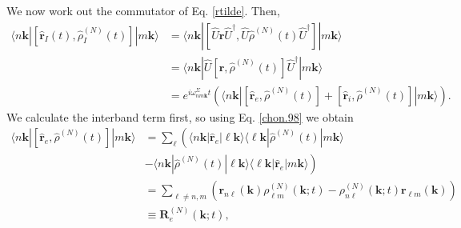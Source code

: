 We now work out the commutator of Eq. \eqref{rtilde}. Then,
\begin{align}\label{conmu1}
\langle n\mathbf{k}|
[\hat{\mathbf{r}}_{I}(t),\hat{\rho}^{(N)}_{I}(t)]
|m\mathbf{k}\rangle
&=
\langle n\mathbf{k}|
[\hat{U}\hat{\mathbf{r}}\hat{U}^\dagger,\hat{U}\hat{\rho}^{(N)}(t)\hat{U}^\dagger]
|m\mathbf{k}\rangle
\nonumber \\
&=
\langle n\mathbf{k}|
\hat{U}[\hat{\mathbf{r}},\hat{\rho}^{(N)}(t)]\hat{U}^\dagger
|m\mathbf{k}\rangle
\\
&=
e^{i\omega^\Sigma_{nm\mathbf{k}}t}
\left(
\langle n\mathbf{k}|
[\hat{\mathbf{r}}_e,\hat{\rho}^{(N)}(t)]
+
[\hat{\mathbf{r}}_i,\hat{\rho}^{(N)}(t)]
|m\mathbf{k}\rangle
\right)
\nonumber
.
\end{align}
We calculate the interband term first, so using Eq. \eqref{chon.98} we obtain
\begin{align}\label{conmu2}
\langle n\mathbf{k}|
[\hat{\mathbf{r}}_e,\hat{\rho}^{(N)}(t)]
|m\mathbf{k}\rangle
&=
\sum_{\ell}
\left(
\langle n\mathbf{k}|
\hat{\mathbf{r}}_e
|\ell\mathbf{k}\rangle
\langle \ell\mathbf{k}|
\hat{\rho}^{(N)}(t)
|m\mathbf{k}\rangle
\right.
\nonumber \\
&
\left.
-
\langle n\mathbf{k}|
\hat{\rho}^{(N)}(t)
|\ell\mathbf{k}\rangle
\langle \ell\mathbf{k}|
\hat{\mathbf{r}}_e
|m\mathbf{k}\rangle
\right)
\nonumber \\
&=
\sum_{\ell\ne n,m}
\left(
\mathbf{r}_{n\ell}(\mathbf{k})
\rho^{(N)}_{\ell m}(\mathbf{k};t)
-
\rho^{(N)}_{n\ell}(\mathbf{k};t)
\mathbf{r}_{\ell m}(\mathbf{k})
\right)
\nonumber\\
&\equiv
\mathbf{R}^{(N)}_e(\mathbf{k};t)
,
\end{align}

